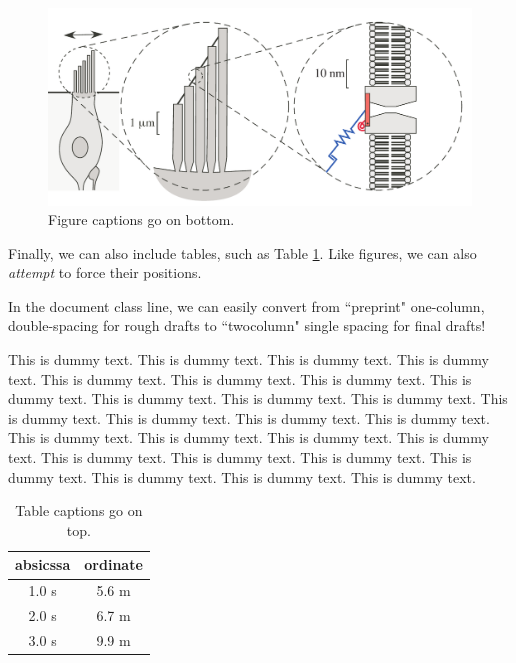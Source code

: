 \documentclass{book}
\begin{document}
\begin{figure}[ht] %
	\begin{center}
		\includegraphics[width=0.8\linewidth]{Figures/ExampleFigure} %
		\caption{Figure captions go on bottom.}
		\label{SchematicDiagram}
	\end{center}
\end{figure}

Finally, we can also include tables, such as Table \ref{demoTable}. Like figures, we can also \emph{attempt} to force their positions. 

In the document class line, we can easily convert from ``preprint" one-column, double-spacing for rough drafts to ``twocolumn" single spacing for final drafts! 

This is dummy text. This is dummy text. This is dummy text. This is dummy text. This is dummy text. This is dummy text. This is dummy text. This is dummy text. This is dummy text. This is dummy text. This is dummy text. This is dummy text. This is dummy text. This is dummy text. This is dummy text. This is dummy text. This is dummy text. This is dummy text. This is dummy text. This is dummy text. This is dummy text. This is dummy text. This is dummy text. This is dummy text. This is dummy text. This is dummy text. 

\begin{table}[h] %
	\caption{Table captions go on top.}
	\label{demoTable}
	\begin{center}
		\begin{tabular}{cc} %
			absicssa & ordinate\\
			\hline
			1.0 s & 5.6 m\\
			2.0 s & 6.7 m\\
			3.0 s & 9.9 m
		\end{tabular}
	\end{center}
\end{table}

\end{document}
